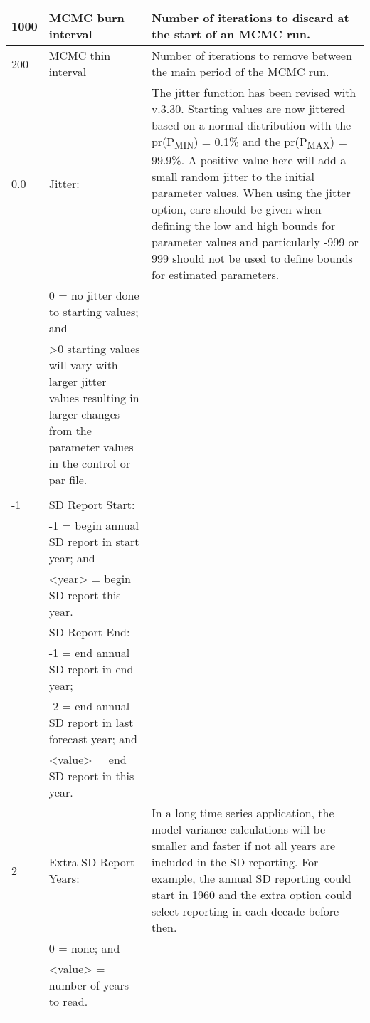 {\begin{landscape}
\begin{longtable}{p{1.5cm} p{7.2cm} p{12.3cm}}
 \hline
 1000 & MCMC burn interval & Number of iterations to discard at the start of an MCMC run. \Tstrut\Bstrut\\
	   
 \hline
 200 & MCMC thin interval & Number of iterations to remove between the main period of the MCMC run. \Tstrut\\
	   
 \hline 
 0.0 & \hyperlink{Jitter}{Jitter:} & \multirow{1}{1cm}[-0.25cm]{\parbox{12.5cm}{The jitter function has been revised with v.3.30. Starting values are now jittered based on a normal distribution with the pr(P\textsubscript{MIN}) = 0.1\% and the pr(P\textsubscript{MAX}) = 99.9\%. A positive value here will add a small random jitter to the initial parameter values. When using the jitter option, care should be given when defining the low and high bounds for parameter values and particularly -999 or 999 should not be used to define bounds for estimated parameters.}} \Tstrut\\ 
	 & 0 = no jitter done to starting values; and & \\
	 & >0 starting values will vary with larger jitter values resulting in larger changes from the parameter values in the control or par file. & \\
	 & & \\
	
 \hline
 -1 & SD Report Start: & \Tstrut\\
    & -1 = begin annual SD report in start year; and & \\
    & <year> = begin SD report this year. & \Bstrut\\
	      
 \pagebreak
 -1 & SD Report End: & \Tstrut\\
    & -1 = end annual SD report in end year; & \\
    & -2 = end annual SD report in last forecast year; and & \\
    & <value> = end SD report in this year. & \Bstrut\\
	   
 \hline
 2 & Extra SD Report Years: & \multirow{1}{1cm}[-0.25cm]{\parbox{12.5cm}{In a long time series application, the model variance calculations will be smaller and faster if not all years are included in the SD reporting. For example, the annual SD reporting could start in 1960 and the extra option could select reporting in each decade before then.}} \Tstrut\\
   & 0 = none; and & \\
   & <value> = number of years to read. &  \\
   & & \\


\end{longtable}
\end{landscape}}
